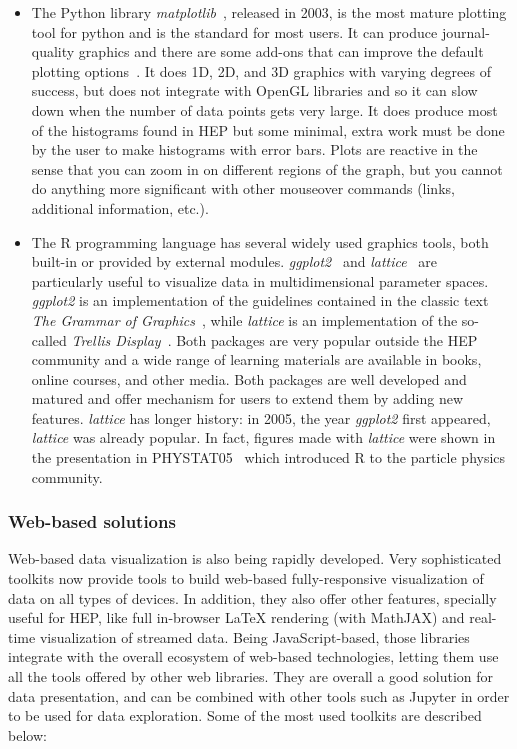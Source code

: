 \documentclass[12pt,a4paper]{article}
\begin{document}
\begin{itemize}
\item The Python library \textit{matplotlib}~\cite{Hunter2007}, released in 2003, is the most mature plotting tool
for python and is the standard for most users. It can produce journal-quality graphics and there are some add-ons
that can improve the default plotting options~\cite{seaborn}. It does 1D, 2D, and 3D graphics with varying degrees
of success, but does not integrate with OpenGL libraries and so it can slow down when the number of data points gets very large.
It does produce most of the histograms found in HEP but some minimal, extra work must be done by the user
to make histograms with error bars. Plots are reactive in the sense that you can zoom in on different regions of the graph,
but you cannot do anything more significant with other mouseover commands (links, additional information, etc.).

\item The R programming language has several widely used graphics tools, both built-in or provided by external modules.
\textit{ggplot2}~\cite{Wickham2009} and \textit{lattice}~\cite{Sarkar2008} are particularly useful to visualize data in
multidimensional parameter spaces. \textit{ggplot2} is an implementation of the guidelines contained in the classic
text \textit{The Grammar of Graphics}~\cite{Wilkinson2005}, while \textit{lattice} is an implementation of the
so-called \textit{Trellis Display}~\cite{Trellis}. Both packages are very popular outside the HEP community and a wide range
of learning materials are available in books, online courses, and other media. Both packages are well developed and matured
and offer mechanism for users to extend them by adding new features.
\textit{lattice} has longer history: in 2005, the year \textit{ggplot2} first appeared, \textit{lattice} was already popular.
In fact, figures made with \textit{lattice} were shown in the
presentation in PHYSTAT05~\cite{phystat05} which introduced R to the
particle physics community.
\end{itemize}

\hypertarget{stats-web}{%
\subsubsection{Web-based solutions}\label{stats-web}}

Web-based data visualization is also being rapidly developed. Very sophisticated toolkits now provide tools to build web-based
fully-responsive visualization of data on all types of devices. In addition, they also offer other features, specially useful
for HEP, like full in-browser LaTeX rendering (with MathJAX) and real-time visualization of streamed data. Being JavaScript-based,
those libraries integrate with the overall ecosystem of web-based technologies, letting them use all the tools offered by other
web libraries. They are overall a good solution for data presentation, and can be combined with other tools such as Jupyter
in order to be used for data exploration. Some of the most used toolkits are described below:
\end{document}
